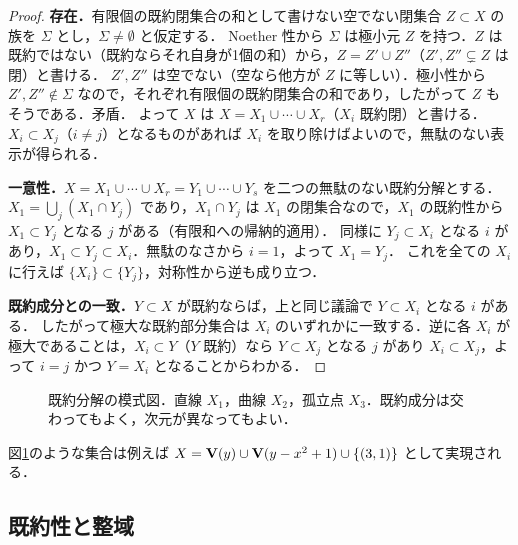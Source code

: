 \begin{proof}
\textbf{存在．}有限個の既約閉集合の和として書けない空でない閉集合 $Z\subset X$ の族を $\Sigma$ とし，$\Sigma\ne\emptyset$ と仮定する．
Noether 性から $\Sigma$ は極小元 $Z$ を持つ．$Z$ は既約ではない（既約ならそれ自身が1個の和）から，$Z=Z'\cup Z''$（$Z',Z''\subsetneq Z$ は閉）と書ける．
$Z',Z''$ は空でない（空なら他方が $Z$ に等しい）．極小性から $Z',Z''\notin\Sigma$ なので，それぞれ有限個の既約閉集合の和であり，したがって $Z$ もそうである．矛盾．
よって $X$ は $X=X_1\cup\cdots\cup X_r$（$X_i$ 既約閉）と書ける．$X_i\subset X_j$（$i\ne j$）となるものがあれば $X_i$ を取り除けばよいので，無駄のない表示が得られる．

\textbf{一意性．}$X=X_1\cup\cdots\cup X_r=Y_1\cup\cdots\cup Y_s$ を二つの無駄のない既約分解とする．
$X_1=\bigcup_j(X_1\cap Y_j)$ であり，$X_1\cap Y_j$ は $X_1$ の閉集合なので，$X_1$ の既約性から $X_1\subset Y_j$ となる $j$ がある（有限和への帰納的適用）．
同様に $Y_j\subset X_i$ となる $i$ があり，$X_1\subset Y_j\subset X_i$．無駄のなさから $i=1$，よって $X_1=Y_j$．
これを全ての $X_i$ に行えば $\{X_i\}\subset\{Y_j\}$，対称性から逆も成り立つ．

\textbf{既約成分との一致．}$Y\subset X$ が既約ならば，上と同じ議論で $Y\subset X_i$ となる $i$ がある．
したがって極大な既約部分集合は $X_i$ のいずれかに一致する．逆に各 $X_i$ が極大であることは，$X_i\subset Y$（$Y$ 既約）なら $Y\subset X_j$ となる $j$ があり $X_i\subset X_j$，よって $i=j$ かつ $Y=X_i$ となることからわかる．
\end{proof}

\begin{figure}[H]
\centering
{}
\caption{既約分解の模式図．直線 $X_1$，曲線 $X_2$，孤立点 $X_3$．既約成分は交わってもよく，次元が異なってもよい．}
\label{fig:ch03-decomp}
\end{figure}

図\ref{fig:ch03-decomp}のような集合は例えば
$X=\mathbf{V}(y)\cup\mathbf{V}(y-x^2+1)\cup\{(3,1)\}$ として実現される．

\subsection{既約性と整域}

